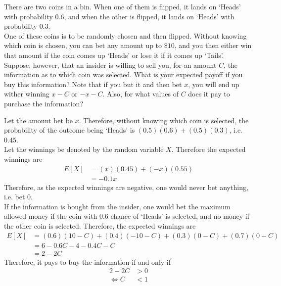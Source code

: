 \documentclass[fleqn, a4paper, 11pt, oneside]{amsart}
\theoremstyle{definition}
\theoremstyle{theorem}
\begin{document}
\begin{question}
	There are two coins in a bin.
	When one of them is flipped, it lands on `Heads' with probability $0.6$, and when the other is flipped, it lands on `Heads' with probability $0.3$.\\
	One of these coins is to be randomly chosen and then flipped.
	Without knowing which coin is chosen, you can bet any amount up to $\$10$, and you then either win that amount if the coin comes up `Heads' or lose it if it comes up `Tails'.\\
	Suppose, however, that an insider is willing to sell you, for an amount $C$, the information as to which coin was selected.
	What is your expected payoff if you buy this information?
	Note that if you but it and then bet $x$, you will end up wither winning $x - C$ or $-x - C$.
	Also, for what values of $C$ does it pay to purchase the information?
\end{question}

\begin{solution}
	Let the amount bet be $x$.
	Therefore, without knowing which coin is selected, the probability of the outcome being `Heads' is $(0.5) (0.6) + (0.5) (0.3)$, i.e. $0.45$.\\
	Let the winnings be denoted by the random variable $X$.
	Therefore the expected winnings are
	\begin{align*}
		E[X] & = (x) (0.45) + (-x) (0.55) \\
                     & = -0.1 x
	\end{align*}
	Therefore, as the expected winnings are negative, one would never bet anything, i.e. bet $0$.\\
	If the information is bought from the insider, one would bet the maximum allowed money if the coin with $0.6$ chance of `Heads' is selected, and no money if the other coin is selected.
	Therefore, the expected winnings are
	\begin{align*}
		E[X] & = (0.6) (10 - C) + (0.4) (-10 - C) + (0.3) (0 - C) + (0.7) (0 - C) \\
                     & = 6 - 0.6 C -4 - 0.4 C - C                                         \\
                     & = 2 - 2 C
	\end{align*}
	Therefore, it pays to buy the information if and only if
	\begin{align*}
		2 - 2 C & > 0 \\
		\iff C  & < 1
	\end{align*}
\end{solution}
\end{document}
